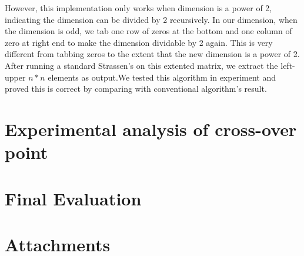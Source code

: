 \documentclass[a4paper, 11pt]{article}
\begin{document}
However, this implementation only works when dimension is a power of 2, indicating the dimension can be divided by 2 recursively. In our dimension, when the dimension is odd, we tab one row of zeros at the bottom and one column of zero at right end to make the dimension dividable by 2 again. This is very different from tabbing zeros to the extent that the new dimension is a power of 2. After running a standard Strassen's on this extented matrix, we extract the left-upper $n*n$ elements as output.We tested this algorithm in experiment and proved this is correct by comparing with conventional algorithm's result.

\section*{Experimental analysis of cross-over point}

\section*{Final Evaluation}

\section*{Attachments}
\end{document}
